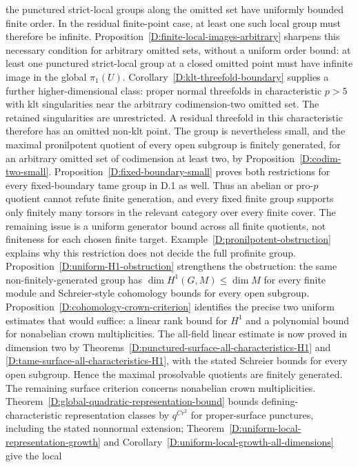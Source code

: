\begin{remark}
the punctured strict-local groups along the omitted set have
uniformly bounded finite order. In the residual finite-point case,
at least one such local group must therefore be infinite.
Proposition~\ref{D:finite-local-images-arbitrary} sharpens this
necessary condition for arbitrary omitted sets, without a uniform
order bound: at least one punctured strict-local group at a closed
omitted point must have infinite image in the global $\pi_1(U)$.
Corollary~\ref{D:klt-threefold-boundary} supplies a further
higher-dimensional class: proper normal threefolds in
characteristic $p>5$ with klt singularities near the arbitrary
codimension-two omitted set.  The retained singularities are
unrestricted.  A residual threefold in this characteristic
therefore has an omitted non-klt point.  The group is nevertheless
small, and the maximal pronilpotent quotient
of every open subgroup is finitely generated, for an arbitrary
omitted set of codimension at least two, by
Proposition~\ref{D:codim-two-small}. Proposition~\ref{D:fixed-boundary-small}
proves both restrictions for every fixed-boundary tame group in
D.1 as well. Thus an abelian or pro-$p$ quotient cannot refute
finite generation, and every fixed finite group supports only
finitely many torsors in the relevant category over every finite
cover. The remaining issue is a uniform generator bound across
all finite quotients, not finiteness for each chosen finite target.
Example~\ref{D:pronilpotent-obstruction} explains why this
restriction does not decide the full profinite group.
Proposition~\ref{D:uniform-H1-obstruction} strengthens the
obstruction: the same non-finitely-generated group has
$\dim H^1(G,M)\leq\dim M$ for every finite module and
Schreier-style cohomology bounds for every open subgroup.
Proposition~\ref{D:cohomology-crown-criterion} identifies the
precise two uniform estimates that would suffice: a linear
rank bound for $H^1$ and a polynomial bound for nonabelian
crown multiplicities.  The all-field linear estimate is now proved in dimension two by
Theorems~\ref{D:punctured-surface-all-characteristics-H1} and
\ref{D:tame-surface-all-characteristics-H1}, with the stated
Schreier bounds for every open subgroup. Hence the maximal
prosolvable quotients are finitely generated. The remaining surface
criterion concerns nonabelian crown multiplicities.
Theorem~\ref{D:global-quadratic-representation-bound} bounds
defining-characteristic representation classes by $q^{Cr^2}$ for
proper-surface punctures, including the stated nonnormal extension;
Theorem~\ref{D:uniform-local-representation-growth} and
Corollary~\ref{D:uniform-local-growth-all-dimensions} give the local

\end{remark}
